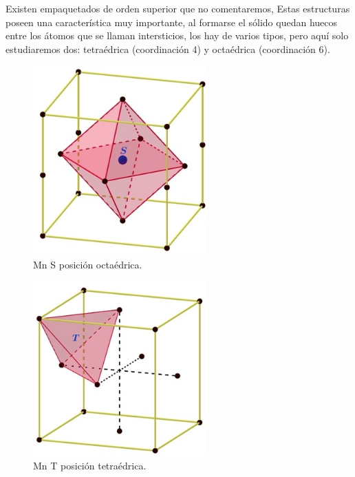 Existen empaquetados de orden superior que no comentaremos, Estas estructuras poseen una característica muy importante, al formarse el sólido quedan huecos entre los átomos que se llaman intersticios, los hay de varios tipos, pero aquí solo estudiaremos dos: tetraédrica (coordinación 4) y octaédrica (coordinación 6).

\begin{figure}[H]
    \centering
    \includegraphics[width=0.6\textwidth]{./Figures/MnOctaedrica}
	\caption{Mn S posición octaédrica.}
	\label{fig:MnOctaedrica}
\end{figure}

\begin{figure}[H]
    \centering
    \includegraphics[width=0.6\textwidth]{./Figures/MnTetragonal}
	\caption{Mn T posición tetraédrica.}
	\label{fig:MnTetraedrica}
\end{figure}

